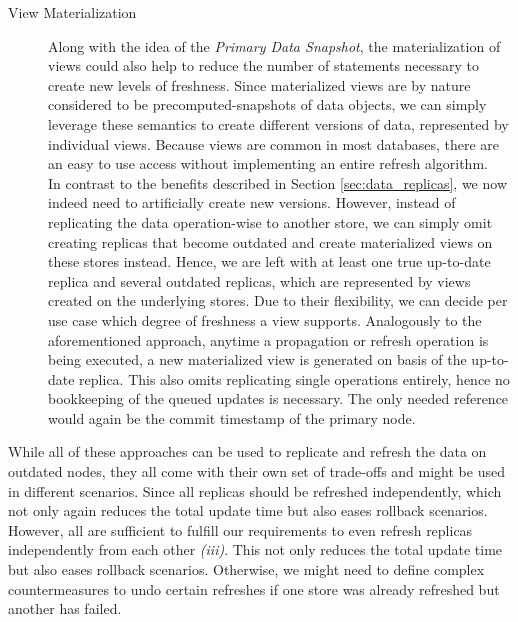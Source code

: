 \begin{description}
    \item [View Materialization]
    Along with the idea of the \emph{Primary Data Snapshot}, the materialization of views could also help to reduce the number of statements necessary to create new levels of freshness.
    Since materialized views are by nature considered to be precomputed-snapshots of data objects, we can simply leverage these semantics to create different versions of data, 
    represented by individual views.
    Because views are common in most databases, there are an easy to use access without implementing an entire refresh algorithm.\\
    In contrast to the benefits described in Section \ref{sec:data_replicas}, we now indeed need to artificially create new versions.
    However, instead of replicating the data operation-wise to another store, we can simply omit creating replicas that become outdated and create materialized views on these 
    stores instead. Hence, we are left with at least one true up-to-date replica and several outdated replicas, which are represented by views created on the underlying stores.
    Due to their flexibility, we can decide per use case which degree of freshness a view supports. 
    Analogously to the aforementioned approach, anytime a propagation or refresh operation is being executed, a new materialized view is generated on basis of the up-to-date replica.
    This also omits replicating single operations entirely, hence no bookkeeping of the queued updates is necessary. 
    The only needed reference would again be the commit timestamp of the primary node. 


\end{description}


While all of these approaches can be used to replicate and refresh the data on outdated nodes,
they all come with their own set of trade-offs and might be used in different scenarios.
Since all replicas should be refreshed independently, which not only again reduces the total update time but also eases rollback scenarios.
However, all are sufficient to fulfill our requirements to even refresh replicas independently from each other \textit{(iii)}.
This not only reduces the total update time but also eases rollback scenarios. 
Otherwise, we might need to define complex countermeasures to undo certain refreshes if one store was already refreshed but another has failed.








